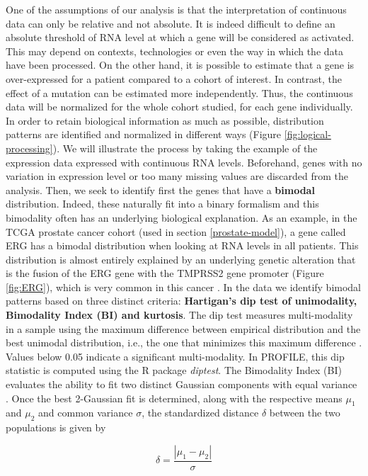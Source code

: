 \documentclass[a4paper,12pt,twoside,onecolumn,openright,final,oldfontcommands]{memoir}
\begin{document}
One of the assumptions of our analysis is that the interpretation of
continuous data can only be relative and not absolute. It is indeed
difficult to define an absolute threshold of RNA level at which a gene
will be considered as activated. This may depend on contexts,
technologies or even the way in which the data have been processed. On
the other hand, it is possible to estimate that a gene is over-expressed
for a patient compared to a cohort of interest. In contrast, the effect
of a mutation can be estimated more independently. Thus, the continuous
data will be normalized for the whole cohort studied, for each gene
individually. In order to retain biological information as much as
possible, distribution patterns are identified and normalized in
different ways (Figure \ref{fig:logical-processing}). We will illustrate
the process by taking the example of the expression data expressed with
continuous RNA levels. Beforehand, genes with no variation in expression
level or too many missing values are discarded from the analysis. Then,
we seek to identify first the genes that have a \textbf{bimodal}
distribution. Indeed, these naturally fit into a binary formalism and
this bimodality often has an underlying biological explanation. As an
example, in the TCGA prostate cancer cohort (used in section
\ref{prostate-model}), a gene called ERG has a bimodal distribution when
looking at RNA levels in all patients. This distribution is almost
entirely explained by an underlying genetic alteration that is the
fusion of the ERG gene with the TMPRSS2 gene promoter (Figure
\ref{fig:ERG}), which is very common in this cancer
\citep{tomlins2005recurrent}. In the data we identify bimodal patterns
based on three distinct criteria: \textbf{Hartigan's dip test of
unimodality, Bimodality Index (BI) and kurtosis}. The dip test measures
multi-modality in a sample using the maximum difference between
empirical distribution and the best unimodal distribution, i.e., the one
that minimizes this maximum difference \citep{hartigan1985dip}. Values
below 0.05 indicate a significant multi-modality. In PROFILE, this dip
statistic is computed using the R package \emph{diptest}. The Bimodality
Index (BI) evaluates the ability to fit two distinct Gaussian components
with equal variance \citep{wang2009bimodality}. Once the best 2-Gaussian
fit is determined, along with the respective means \(\mu_1\) and
\(\mu_2\) and common variance \(\sigma\), the standardized distance
\(\delta\) between the two populations is given by

\[\delta = \dfrac{|\mu_1-\mu_2|}{\sigma}\]
\end{document}
